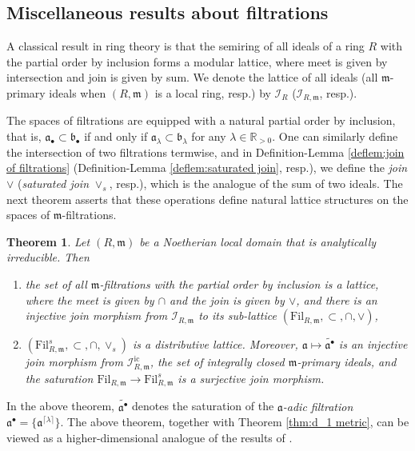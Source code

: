 \documentclass[11pt, leqno]{amsart}%
\theoremstyle{plain}
\newtheorem{theorem}{Theorem}[section]
\theoremstyle{definition}
\theoremstyle{remark}
\newcommand{\cI}{\mathcal{I}}
\newcommand{\cX}{\mathcal{X}}
\newcommand{\bR}{\mathbb{R}}
\newcommand{\fa}{\mathfrak{a}}
\newcommand{\fb}{\mathfrak{b}}
\newcommand{\fm}{\mathfrak{m}}
\newcommand{\ic}{\mathrm{ic}}
\newcommand{\Nef}{\mathrm{Nef}}
\newcommand{\Fil}{\mathrm{Fil}}
\numberwithin{equation}{section}
\begin{document}
\subsection{Miscellaneous results about filtrations}


A classical result in ring theory is that the semiring of all ideals of a ring $R$ with the partial order by inclusion forms a modular lattice, where meet is given by intersection and join is given by sum. We denote the lattice of all ideals (all $\fm$-primary ideals when $(R,\fm)$ is a local ring, resp.) by $\cI_R$ ($\cI_{R,\fm}$, resp.).

The spaces of filtrations are equipped with a natural partial order by inclusion, that is, $\fa_\bullet\subset\fb_\bullet$ if and only if $\fa_\lambda\subset\fb_\lambda$ for any $\lambda\in\bR_{>0}$. One can similarly define the intersection of two filtrations termwise, and in Definition-Lemma \ref{deflem:join of filtrations} (Definition-Lemma \ref{deflem:saturated join}, resp.), we define the \emph{join} $\vee$ (\emph{saturated join} $\vee_s$, resp.), which is the analogue of the sum of two ideals. The next theorem asserts that these operations define natural lattice structures on the spaces of  $\fm$-filtrations. %

\begin{theorem}\label{thm:lattice}
    Let $(R,\fm)$ be a Noetherian local domain that is analytically irreducible. Then
    \begin{enumerate}
        \item the set of all $\fm$-filtrations with the partial order by inclusion is a lattice, where the meet is given by $\cap$ and the join is given by $\vee$, and there is an injective join morphism from $\cI_{R,\fm}$ to its sub-lattice $(\Fil_{R,\fm},\subset,\cap,\vee)$, 
		
		\item $(\Fil^s_{R,\fm},\subset,\cap,\vee_s)$ is a distributive lattice. Moreover, $\fa\mapsto\widetilde{\fa^\bullet}$ is an injective join morphism from $\cI^{\ic}_{R,\fm}$, the set of integrally closed $\fm$-primary ideals, and the saturation $\Fil_{R,\fm}\to\Fil^s_{R,\fm}$ is a surjective join morphism. 
	\end{enumerate}
\end{theorem}

In the above theorem, $\widetilde{\fa^\bullet}$ denotes the saturation of the \emph{$\fa$-adic filtration} $\fa^\bullet=\{\fa^{\lceil \lambda \rceil}\}$. The above theorem, together with Theorem \ref{thm:d_1 metric}, can be viewed as a higher-dimensional analogue of the results of \cite{FJ04}.
\end{document}
